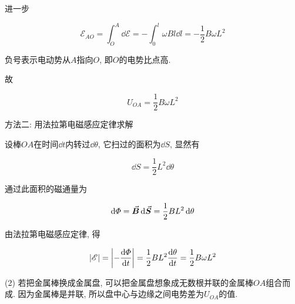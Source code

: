 \begin{example}
\begin{solution}
		进一步
		
		\begin{equation*}
			\mathscr{E}_{AO} = \int_{O}^{A} \dd{\mathscr{E}} = - \int_{0}^{l} \omega B l \dd{l} = - \dfrac{1}{2} B \omega L^2
		\end{equation*}
		
		负号表示电动势从$A$指向$O$, 即$O$的电势比点高.
		
		故
		
		\begin{equation*}
			U_{OA} = \dfrac{1}{2} B \omega L^2
		\end{equation*}
		
		方法二: 用法拉第电磁感应定律求解
		
		设棒$OA$在时间$\dd{t}$内转过$\dd{\theta}$, 它扫过的面积为$\dd{S}$, 显然有
		
		\begin{equation*}
			\dd{S} = \dfrac{1}{2} L^2 \dd{\theta}
		\end{equation*}
		
		通过此面积的磁通量为
		
		\begin{equation*}
			\dd{\varPhi} = \va*{B} \dd{\va*{S}} = \dfrac{1}{2} B L^2 \dd{\theta}
		\end{equation*}
		
		由法拉第电磁感应定律, 得
		
		\begin{equation*}
			\abs{\mathscr{E}} = \abs{-\dv{\varPhi}{t}} = \dfrac{1}{2} B L^2 \dv{\theta}{t} = \dfrac{1}{2} B \omega L^2
		\end{equation*}
		
		(2) 若把金属棒换成金属盘, 可以把金属盘想象成无数根并联的金属棒$OA$组合而成. 因为金属棒是并联, 所以盘中心与边缘之间电势差为$U_{OA}$的值. 
		
	\end{solution}
	
\end{example}

